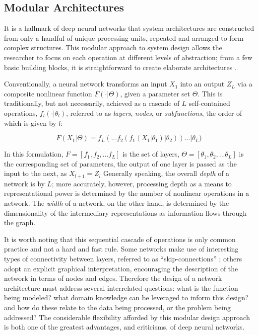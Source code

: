 \subsection{Modular Architectures}
\label{subsec:architectures}

It is a hallmark of deep neural networks that system architectures are constructed from only a handful of unique processing units, repeated and arranged to form complex structures.
This modular approach to system design allows the researcher to focus on each operation at different levels of abstraction;
from a few basic building blocks, it is straightforward to create elaborate architectures \cite{inceptionnet}.

Conventionally, a neural network transforms an input $X_{1}$ into an output $Z_{L}$ via a composite nonlinear function $F(\cdot \vert \Theta)$, given a parameter set $\Theta$.
This is traditionally, but not necessarily, achieved as a cascade of $L$ self-contained operations, $f_l(\cdot \vert \theta_l)$, referred to as \emph{layers}, \emph{nodes}, or \emph{subfunctions}, the order of which is given by $l$:

\begin{equation}
\label{eq:layers}
F(X_{1} \vert \Theta) = f_{L}(  ... f_2(f_1(X_{1} \vert \theta_1) \vert \theta_2) ) ... \vert \theta_{L})
\end{equation}

\noindent In this formulation, $F = [f_1, f_2, ... f_{L} ]$ is the set of layers, $\Theta = [\theta_1, \theta_2, ... \theta_{L} ]$ is the corresponding set of parameters, the output of one layer is passed as the input to the next, as $X_{l+1} = Z_{l}$
Generally speaking, the overall \emph{depth} of a network is by $L$;
more accurately, however, processing depth as a means to representational power is determined by the number of nonlinear operations in a network.
The \emph{width} of a network, on the other hand, is determined by the dimensionality of the intermediary representations as information flows through the graph.

It is worth noting that this sequential cascade of operations is only common practice and not a hard and fast rule.
Some networks make use of interesting types of connectivity between layers, referred to as ``skip-connections'' \cite{LeCun};
others adopt an explicit graphical interpretation, encouraging the description of the network in terms of nodes and edges.
Therefore the design of a network architecture must address several interrelated questions:
what is the function being modeled?
what domain knowledge can be leveraged to inform this design?
and how do these relate to the data being processed, or the problem being addressed?
The considerable flexibility afforded by this modular design approach is both one of the greatest advantages, and criticisms, of deep neural networks.

